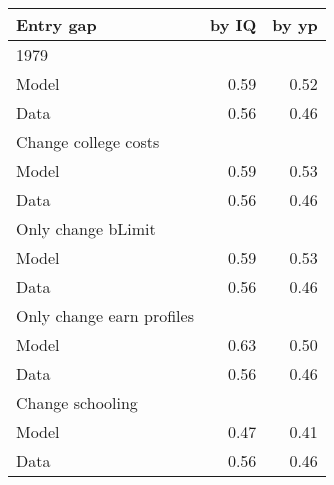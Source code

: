 \begin{tabular}{lrr}
\hline
Entry gap & by IQ  & by yp  \\ 
\hline
1979 &   &   \\ 
Model & 0.59  & 0.52  \\ 
Data & 0.56  & 0.46  \\ 
Change college costs &   &   \\ 
Model & 0.59  & 0.53  \\ 
Data & 0.56  & 0.46  \\ 
Only change bLimit &   &   \\ 
Model & 0.59  & 0.53  \\ 
Data & 0.56  & 0.46  \\ 
Only change earn profiles &   &   \\ 
Model & 0.63  & 0.50  \\ 
Data & 0.56  & 0.46  \\ 
Change schooling &   &   \\ 
Model & 0.47  & 0.41  \\ 
Data & 0.56  & 0.46  \\ 
\hline
\end{tabular}%
